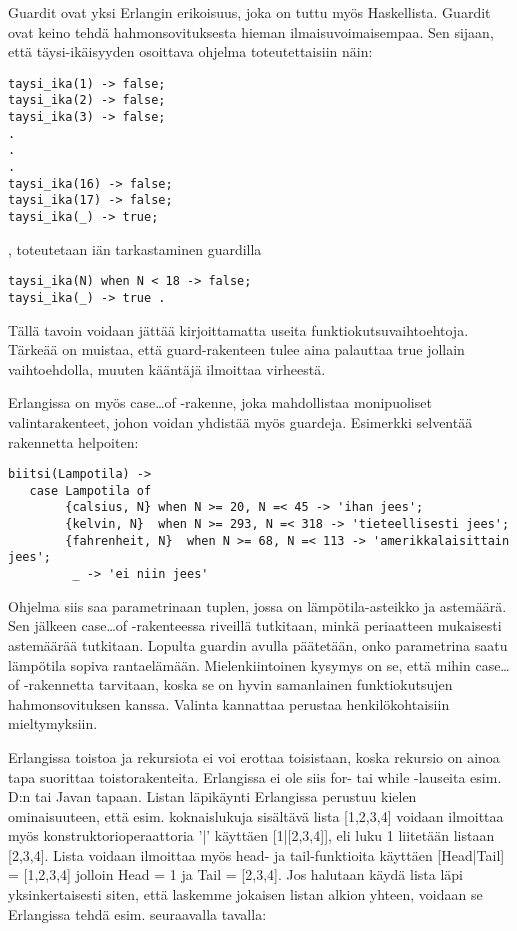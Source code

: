 \documentclass[11pt,oneside,a4paper]{article}
\begin{document}
Guardit ovat yksi Erlangin erikoisuus, joka on tuttu myös Haskellista. Guardit
ovat keino tehdä hahmonsovituksesta hieman ilmaisuvoimaisempaa. Sen sijaan, että
täysi-ikäisyyden osoittava ohjelma 
toteutettaisiin näin: 
\begin{verbatim}
taysi_ika(1) -> false;
taysi_ika(2) -> false;
taysi_ika(3) -> false;
.
.
.
taysi_ika(16) -> false;
taysi_ika(17) -> false;
taysi_ika(_) -> true;
\end{verbatim}
, toteutetaan iän tarkastaminen guardilla
\begin{verbatim}
taysi_ika(N) when N < 18 -> false;
taysi_ika(_) -> true . 
\end{verbatim}

Tällä tavoin voidaan jättää kirjoittamatta useita funktiokutsuvaihtoehtoja. 
Tärkeää on muistaa, että guard-rakenteen tulee aina palauttaa true jollain
vaihtoehdolla, muuten kääntäjä ilmoittaa virheestä.  

Erlangissa on myös case…of -rakenne, joka mahdollistaa monipuoliset
valintarakenteet, johon voidan yhdistää myös guardeja. Esimerkki selventää
rakennetta helpoiten:
\begin{verbatim}
biitsi(Lampotila) -> 
   case Lampotila of
        {calsius, N} when N >= 20, N =< 45 -> 'ihan jees';
        {kelvin, N}  when N >= 293, N =< 318 -> 'tieteellisesti jees';  
        {fahrenheit, N}  when N >= 68, N =< 113 -> 'amerikkalaisittain jees'; 
         _ -> 'ei niin jees' 
\end{verbatim}

Ohjelma siis saa parametrinaan tuplen, jossa on lämpötila-asteikko ja astemäärä.
Sen jälkeen case…of -rakenteessa riveillä  tutkitaan, minkä periaatteen
mukaisesti astemäärää tutkitaan. Lopulta guardin avulla päätetään, onko
parametrina saatu lämpötila sopiva rantaelämään. Mielenkiintoinen kysymys on se, että mihin
case…of -rakennetta tarvitaan, koska se on hyvin samanlainen funktiokutsujen
hahmonsovituksen kanssa. Valinta kannattaa perustaa henkilökohtaisiin
mieltymyksiin. 

Erlangissa toistoa ja rekursiota ei voi erottaa toisistaan, koska rekursio on
ainoa tapa suorittaa toistorakenteita. Erlangissa ei ole siis for- tai while
-lauseita esim. D:n tai Javan tapaan. Listan läpikäynti Erlangissa perustuu
kielen ominaisuuteen, että
esim. koknaislukuja sisältävä lista [1,2,3,4]  voidaan ilmoittaa myös
konstruktorioperaattoria '|' käyttäen [1|[2,3,4]], eli luku 1 liitetään listaan
[2,3,4]. Lista voidaan ilmoittaa myös head- ja tail-funktioita käyttäen
[Head|Tail] = [1,2,3,4] jolloin Head = 1 ja Tail = [2,3,4].
Jos halutaan käydä lista läpi yksinkertaisesti siten, että laskemme jokaisen
listan alkion yhteen, voidaan se Erlangissa tehdä esim. seuraavalla tavalla:
\end{document}
